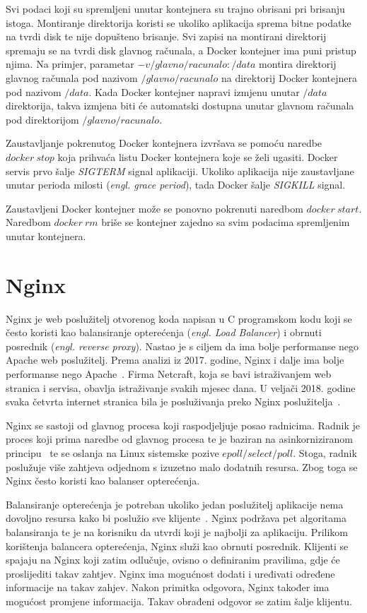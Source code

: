 Svi podaci koji su spremljeni unutar kontejnera su trajno obrisani pri brisanju istoga. Montiranje
direktorija koristi se ukoliko aplikacija sprema bitne podatke na tvrdi disk te nije dopušteno
brisanje. Svi zapisi na montirani direktorij spremaju se na tvrdi disk glavnog računala, a Docker
kontejner ima puni pristup njima. Na primjer, parametar $-v /glavno/racunalo:/data$ montira
direktorij glavnog računala pod nazivom $/glavno/racunalo$ na direktorij Docker kontejnera pod
nazivom $/data$. Kada Docker kontejner napravi izmjenu unutar $/data$ direktorija, takva izmjena
biti će automatski dostupna unutar glavnom računala pod direktorijom $/glavno/racunalo$.

Zaustavljanje pokrenutog Docker kontejnera izvršava se pomoću naredbe $docker~stop$ koja prihvaća
listu Docker kontejnera koje se želi ugasiti. Docker servis prvo šalje \textit{SIGTERM} signal
aplikaciji. Ukoliko aplikacija nije zaustavljane unutar perioda milosti (\textit{engl. grace
period}), tada Docker šalje \textit{SIGKILL} signal.

Zaustavljeni Docker kontejner može se ponovno pokrenuti naredbom $docker~start$. Naredbom
$docker~rm$ briše se kontejner zajedno sa svim podacima spremljenim unutar kontejnera.

\section{Nginx}
Nginx je web poslužitelj otvorenog koda napisan u C programskom kodu koji se često koristi kao
balansiranje opterećenja (\textit{engl. Load Balancer}) i obrnuti posrednik (\textit{engl. reverse
proxy}). Nastao je s ciljem da ima bolje performanse nego Apache web poslužitelj. Prema analizi iz
2017. godine, Nginx i dalje ima bolje performanse nego Apache~\citep{nguyen2017comparative}.
Firma Netcraft, koja se bavi istraživanjem web stranica i servisa, obavlja istraživanje svakih
mjesec dana. U veljači 2018. godine svaka četvrta internet stranica bila je posluživanja preko Nginx
poslužitelja~\citep{Netcraft2018}.

Nginx se sastoji od glavnog procesa koji raspodjeljuje posao radnicima. Radnik je proces koji prima
naredbe od glavnog procesa te je baziran na asinkorniziranom principu~\citep{reese2008nginx} te se
oslanja na Linux sistemske pozive $epoll/select/poll$. Stoga, radnik poslužuje više zahtjeva
odjednom s izuzetno malo dodatnih resursa. Zbog toga se Nginx često koristi kao balanser
opterećenja.

Balansiranje opterećenja je potreban ukoliko jedan poslužitelj aplikacije nema dovoljno resursa kako
bi poslužio sve klijente~\citep{soni2016load}. Nginx podržava pet algoritama balansiranja te je na
korisniku da utvrdi koji je najbolji za aplikaciju. Prilikom korištenja balancera opterećenja, Nginx
služi kao obrnuti posrednik. Klijenti se spajaju na Nginx koji zatim odlučuje, ovisno o definiranim
pravilima, gdje će proslijediti takav zahtjev. Nginx ima mogućnost dodati i uređivati određene
informacije na takav zahjev. Nakon primitka odgovora, Nginx također ima mogućost promjene
informacija. Takav obrađeni odgovor se zatim šalje klijentu.

